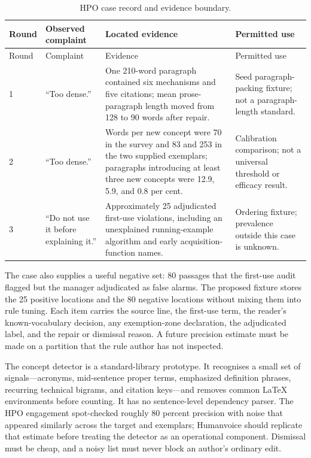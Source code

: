 \begin{longtable}{@{}p{}p{}p{}p{}@{}}
\caption{HPO case record and evidence boundary.}
\label{tab:hpo-case-record}\\
\toprule
Round & Observed complaint & Located evidence & Permitted use \\
\midrule
\endfirsthead
\toprule
Round & Complaint & Evidence & Permitted use \\
\midrule
\endhead
1 & ``Too dense.'' & One 210-word paragraph contained six mechanisms and five
citations; mean prose-paragraph length moved from 128 to 90 words after repair.
& Seed paragraph-packing fixture; not a paragraph-length standard. \\
2 & ``Too dense.'' & Words per new concept were 70 in the survey and 83 and 253
in the two supplied exemplars; paragraphs introducing at least three new
concepts were 12.9, 5.9, and 0.8 per cent. & Calibration comparison; not a
universal threshold or efficacy result. \\
3 & ``Do not use it before explaining it.'' & Approximately 25 adjudicated
first-use violations, including an unexplained running-example algorithm and
early acquisition-function names. & Ordering fixture; prevalence outside this
case is unknown. \\
\bottomrule
\end{longtable}

The case also supplies a useful negative set: 80 passages that the first-use
audit flagged but the manager adjudicated as false alarms. The proposed
fixture stores the 25 positive locations and the 80 negative locations without
mixing them into rule tuning. Each item carries the source line, the first-use
term, the reader's known-vocabulary decision, any exemption-zone declaration,
the adjudicated label, and the repair or dismissal reason. A future precision
estimate must be made on a partition that the rule author has not inspected.

The concept detector is a standard-library prototype. It recognises a small
set of signals---acronyms, mid-sentence proper terms, emphasized definition
phrases, recurring technical bigrams, and citation keys---and removes common
LaTeX environments before counting. It has no sentence-level dependency
parser. The HPO engagement spot-checked roughly 80 percent precision with
noise that appeared similarly across the target and exemplars; Humanvoice
should replicate that estimate before treating the detector as an operational
component. Dismissal must be cheap, and a noisy list must never block an
author's ordinary edit.

